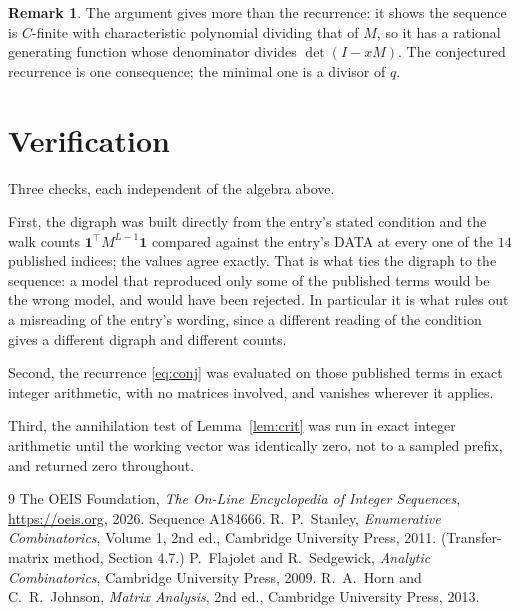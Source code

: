 \documentclass[11pt,a4paper]{article}
\theoremstyle{plain}
\theoremstyle{definition}
\newtheorem{remark}[theorem]{Remark}
\begin{document}
\begin{remark}
The argument gives more than the recurrence: it shows the sequence is $C$-finite with
characteristic polynomial dividing that of $M$, so it has a rational generating function
whose denominator divides $\det(I-xM)$. The conjectured recurrence is one consequence; the
minimal one is a divisor of $q$.
\end{remark}

\section{Verification}

Three checks, each independent of the algebra above.

First, the digraph was built directly from the entry's stated condition and the walk counts
$\mathbf{1}^{\!\top}M^{L-1}\mathbf{1}$ compared against the entry's DATA at
every one of the $14$ published indices; the values agree exactly. That is what ties
the digraph to the sequence: a model that reproduced only some of the published terms would
be the wrong model, and would have been rejected. In particular it is what rules out a
misreading of the entry's wording, since a different reading of the condition gives a
different digraph and different counts.

Second, the recurrence \eqref{eq:conj} was evaluated on those published terms in exact
integer arithmetic, with no matrices involved, and vanishes wherever it applies.

Third, the annihilation test of Lemma~\ref{lem:crit} was run in exact integer arithmetic
until the working vector was identically zero, not to a sampled prefix, and returned zero
throughout.

\begin{thebibliography}{9}
 The OEIS Foundation, \emph{The On-Line Encyclopedia of Integer
Sequences}, \url{https://oeis.org}, 2026. Sequence A184666.
 R.~P.~Stanley, \emph{Enumerative Combinatorics}, Volume 1, 2nd ed.,
Cambridge University Press, 2011. (Transfer-matrix method, Section 4.7.)
 P.~Flajolet and R.~Sedgewick, \emph{Analytic Combinatorics}, Cambridge
University Press, 2009.
 R.~A.~Horn and C.~R.~Johnson, \emph{Matrix Analysis}, 2nd ed., Cambridge
University Press, 2013.
\end{thebibliography}
\end{document}

